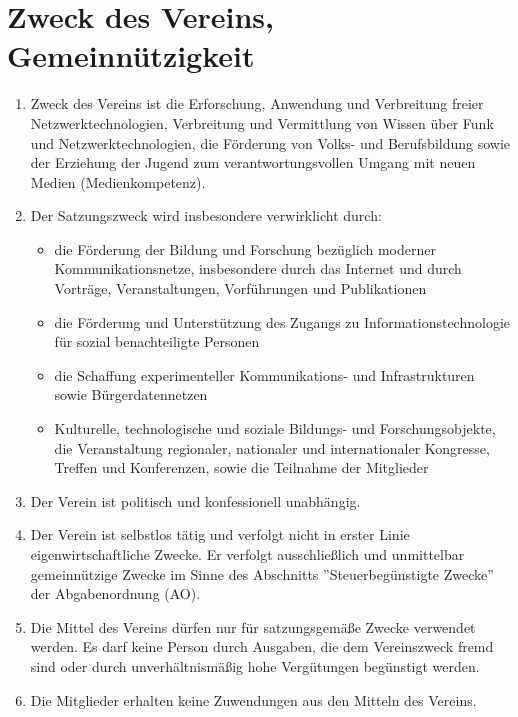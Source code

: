 \documentclass[12pt,a4paper,titlepage]{scrartcl}
\begin{document}
\section{Zweck des Vereins, Gemeinnützigkeit}
\begin{enumerate}
\item Zweck des Vereins ist die Erforschung, Anwendung und Verbreitung freier 
Netzwerktechnologien, Verbreitung und Vermittlung von Wissen über Funk und 
Netzwerktechnologien,  die Förderung von Volks- und Berufsbildung sowie der Erziehung der Jugend zum verantwortungsvollen Umgang mit neuen Medien (Medienkompetenz).
\item Der Satzungszweck wird insbesondere verwirklicht durch:
\begin{itemize}
\item die Förderung der Bildung und Forschung bezüglich moderner Kommunikationsnetze, insbesondere durch das Internet und durch Vorträge, Veranstaltungen, Vorführungen und Publikationen
\item die Förderung und Unterstützung des Zugangs zu Informationstechnologie für sozial benachteiligte Personen
\item die Schaffung experimenteller Kommunikations- und Infrastrukturen sowie Bürgerdatennetzen
\item Kulturelle, technologische und soziale Bildungs- und Forschungsobjekte, die Veranstaltung regionaler, nationaler und internationaler Kongresse, Treffen und Konferenzen, sowie die Teilnahme der Mitglieder
\end{itemize}
\item Der Verein ist politisch und konfessionell unabhängig.
\item Der Verein ist selbstlos tätig und verfolgt nicht in erster Linie eigenwirtschaftliche Zwecke. Er verfolgt ausschließlich und unmittelbar gemeinnützige Zwecke im Sinne des Abschnitts ''Steuerbegünstigte Zwecke'' der Abgabenordnung (AO).
\item Die Mittel des Vereins dürfen nur für satzungsgemäße Zwecke verwendet werden. Es darf keine Person durch Ausgaben, die dem Vereinszweck fremd sind oder durch unverhältnismäßig hohe Vergütungen begünstigt werden.
\item Die Mitglieder erhalten keine Zuwendungen aus den Mitteln des Vereins.
\end{enumerate}
\end{document}
